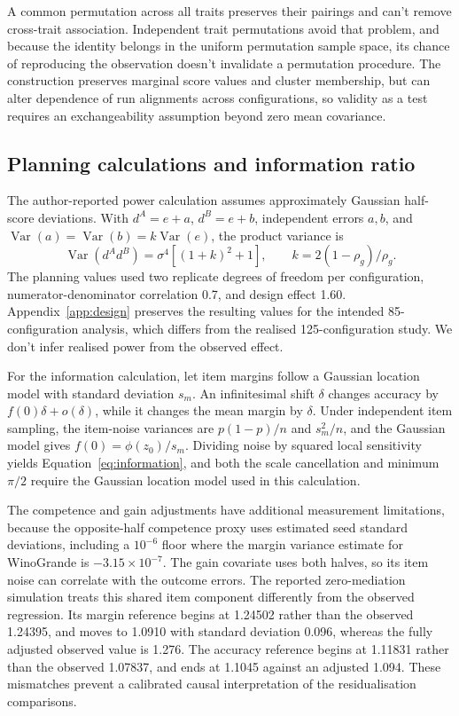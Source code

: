 A common permutation across all traits preserves their pairings and can't remove cross-trait association. Independent trait permutations avoid that problem, and because the identity belongs in the uniform permutation sample space, its chance of reproducing the observation doesn't invalidate a permutation procedure. The construction preserves marginal score values and cluster membership, but can alter dependence of run alignments across configurations, so validity as a test requires an exchangeability assumption beyond zero mean covariance.

\subsection{Planning calculations and information ratio}
The author-reported power calculation assumes approximately Gaussian half-score deviations. With $d^A=e+a$, $d^B=e+b$, independent errors $a,b$, and $\operatorname{Var}(a)=\operatorname{Var}(b)=k\operatorname{Var}(e)$, the product variance is
\begin{equation}
\operatorname{Var}(d^Ad^B)=\sigma^4[(1+k)^2+1],\qquad
k=2(1-\rho_g)/\rho_g.
\end{equation}
The planning values used two replicate degrees of freedom per configuration, numerator-denominator correlation 0.7, and design effect 1.60. Appendix~\ref{app:design} preserves the resulting values for the intended 85-configuration analysis, which differs from the realised 125-configuration study. We don't infer realised power from the observed effect.

For the information calculation, let item margins follow a Gaussian location model with standard deviation $s_m$. An infinitesimal shift $\delta$ changes accuracy by $f(0)\delta+o(\delta)$, while it changes the mean margin by $\delta$. Under independent item sampling, the item-noise variances are $p(1-p)/n$ and $s_m^2/n$, and the Gaussian model gives $f(0)=\phi(z_0)/s_m$. Dividing noise by squared local sensitivity yields Equation~\ref{eq:information}, and both the scale cancellation and minimum $\pi/2$ require the Gaussian location model used in this calculation.

The competence and gain adjustments have additional measurement limitations, because the opposite-half competence proxy uses estimated seed standard deviations, including a $10^{-6}$ floor where the margin variance estimate for WinoGrande is $-3.15\times10^{-7}$. The gain covariate uses both halves, so its item noise can correlate with the outcome errors. The reported zero-mediation simulation treats this shared item component differently from the observed regression. Its margin reference begins at 1.24502 rather than the observed 1.24395, and moves to 1.0910 with standard deviation 0.096, whereas the fully adjusted observed value is 1.276. The accuracy reference begins at 1.11831 rather than the observed 1.07837, and ends at 1.1045 against an adjusted 1.094. These mismatches prevent a calibrated causal interpretation of the residualisation comparisons. 